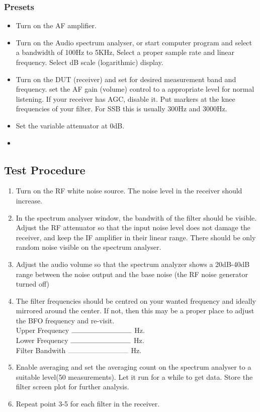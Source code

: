 \documentclass[10pt,letterpaper]{book}
\begin{document}
\subsubsection*{Presets}
\begin{itemize}
	\item Turn on the AF amplifier.
	\item Turn on the Audio spectrum analyser, or start computer program and select a bandwidth of 100Hz to 5KHz, Select a proper sample rate and linear frequency. Select dB scale (logarithmic) display. 
	\item Turn on the DUT (receiver) and set for desired measurement band and frequency. set the AF gain (volume) control to a appropriate level for normal listening. If your receiver has AGC, disable it. Put markers at the knee frequencies of your filter. For SSB this is usually 300Hz and 3000Hz.
	\item Set the variable attenuator at 0dB.
	\item 
\end{itemize}
\subsection*{Test Procedure}
\begin{enumerate}
	\item  Turn on the RF white noise source. The noise level in the receiver should increase. 
	\item In the spectrum analyser window, the bandwith of the filter should be visible. Adjust the RF attenuator so that the input noise level does not damage the receiver, and keep the IF amplifier in their linear range. There should be only random noise visible on the spectrum analyser.
	\item Adjust the audio volume so that the spectrum analyzer shows a 20dB-40dB range between the noise output and the base noise (the RF noise generator turned off)
	\item The filter frequencies should be centred on your wanted frequency and ideally mirrored around the center.  If not, then this may be a proper place to adjust the BFO frequency and re-visit. 
	\vspace{30pt}
	\\Upper Frequency $\rule{3cm}{0.1mm}$ Hz. \vspace{30pt}
	\\Lower Frequency $\rule{3cm}{0.1mm}$ Hz. \vspace{30pt}
	\\Filter Bandwith $\rule{3cm}{0.1mm}$ Hz.
	\item Enable averaging and set the averaging count on the spectrum analyser to a suitable level(50 measurements). Let it run for a while to get data.  Store the filter screen plot for further analysis.
	\item Repeat point 3-5 for each filter in the receiver.
	
\end{enumerate}
\end{document}
